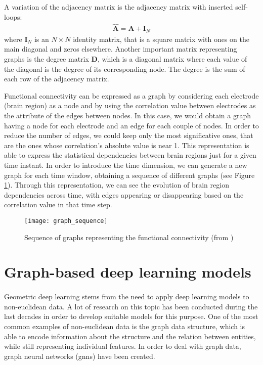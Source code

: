 A variation of the adjacency matrix is the adjacency matrix with inserted self-loops:
\begin{align*}
    \hat{\mathbf{A}} = \mathbf{A} + \mathbf{I}_N
\end{align*}
where $\mathbf{I}_N$ is an $N \times N$ identity matrix, that is a square matrix with ones on the main diagonal and zeros elsewhere. Another important matrix representing graphs is the degree matrix $\mathbf{D}$, which is a diagonal matrix where each value of the diagonal is the degree of its corresponding node. The degree is the sum of each row of the adjacency matrix.

Functional connectivity can be expressed as a graph by considering each electrode (brain region) as a node and by using the correlation value between electrodes as the attribute of the edges between nodes. In this case, we would obtain a graph having a node for each electrode and an edge for each couple of nodes. In order to reduce the number of edges, we could keep only the most significative ones, that are the ones whose correlation's absolute value is near 1. This representation is able to express the statistical dependencies between brain regions just for a given time instant. In order to introduce the time dimension, we can generate a new graph for each time window, obtaining a sequence of different graphs (see Figure \ref{fig:graph_sequence}). Through this representation, we can see the evolution of brain region dependencies across time, with edges appearing or disappearing based on the correlation value in that time step.
\begin{figure}[htbp]
    \centering
    \texttt{[image: graph\_sequence]}
    \caption{Sequence of graphs representing the functional connectivity (from \cite{arXiv:graphstream})}
    \label{fig:graph_sequence}
\end{figure}


\section{Graph-based deep learning models} \label{sec: graph_dl}
\paragraph{} Geometric deep learning stems from the need to apply deep learning models to non-euclidean data. A lot of research on this topic has been conducted during the last decades in order to develop suitable models for this purpose. One of the most common examples of non-euclidean data is the graph data structure, which is able to encode information about the structure and the relation between entities, while still representing individual features. In order to deal with graph data, graph neural networks (\acsp{gnn}) have been created.

